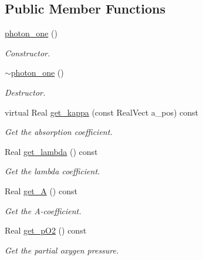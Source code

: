 \subsection*{Public Member Functions}
\begin{DoxyCompactItemize}
\item 
\hyperlink{classmorrow__lowke_1_1photon__one_a3ff013411490d56088305748ba8c77f1}{photon\+\_\+one} ()
\begin{DoxyCompactList}\small\item\em Constructor. \end{DoxyCompactList}\item 
\hyperlink{classmorrow__lowke_1_1photon__one_ac381230a3c86e1e9064c45ae4fd4a6e1}{$\sim$photon\+\_\+one} ()
\begin{DoxyCompactList}\small\item\em Destructor. \end{DoxyCompactList}\item 
virtual Real \hyperlink{classmorrow__lowke_1_1photon__one_a10aa4b1fa282d3c11e9820691529a54c}{get\+\_\+kappa} (const Real\+Vect a\+\_\+pos) const 
\begin{DoxyCompactList}\small\item\em Get the absorption coefficient. \end{DoxyCompactList}\item 
Real \hyperlink{classmorrow__lowke_1_1photon__one_aa00d0aca9438af79e03c398450971395}{get\+\_\+lambda} () const 
\begin{DoxyCompactList}\small\item\em Get the lambda coefficient. \end{DoxyCompactList}\item 
Real \hyperlink{classmorrow__lowke_1_1photon__one_a89c1a01ee38ea0020ba94df70310fb57}{get\+\_\+A} () const 
\begin{DoxyCompactList}\small\item\em Get the A-\/coefficient. \end{DoxyCompactList}\item 
Real \hyperlink{classmorrow__lowke_1_1photon__one_a234b5ff531b3b639d47593936cb86f9a}{get\+\_\+p\+O2} () const 
\begin{DoxyCompactList}\small\item\em Get the partial oxygen pressure. \end{DoxyCompactList}\end{DoxyCompactItemize}
